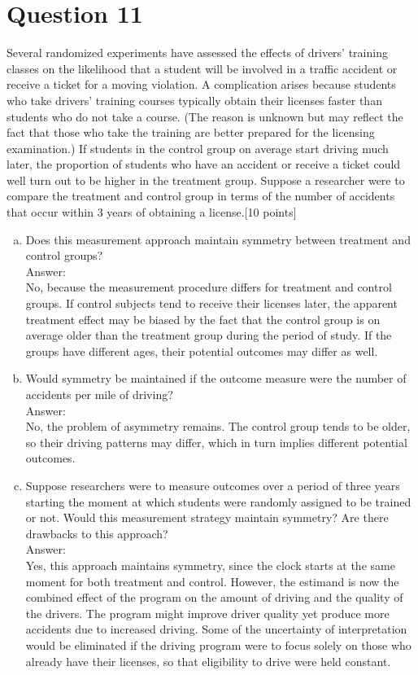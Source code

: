 \documentclass[11pt,notitlepage]{article}\usepackage[]{graphicx}\usepackage[]{color}
\begin{document}
\section*{Question 11}
Several randomized experiments have assessed the effects of drivers' training classes on the likelihood that a student will be involved in a traffic accident or receive a ticket for a moving violation.   A complication arises because students who take drivers' training courses typically obtain their licenses faster than students who do not take a course. (The reason is unknown but may reflect the fact that those who take the training are better prepared for the licensing examination.)  If students in the control group on average start driving much later, the proportion of students who have an accident or receive a ticket could well turn out to be higher in the treatment group.  Suppose a researcher were to compare the treatment and control group in terms of the number of accidents that occur within 3 years of obtaining a license.[10 points]

\begin{enumerate}[a)]
\item Does this measurement approach maintain symmetry between treatment and control groups?  \\
Answer:\\
No, because the measurement procedure differs for treatment and control groups.  If control subjects tend to receive their licenses later, the apparent treatment effect may be biased by the fact that the control group is on average older than the treatment group during the period of study.  If the groups have different ages, their potential outcomes may differ as well.\\
\item Would symmetry be maintained if the outcome measure were the number of accidents per mile of driving?  \\
Answer:\\
No, the problem of asymmetry remains.  The control group tends to be older, so their driving patterns may differ, which in turn implies different potential outcomes.
\item Suppose researchers were to measure outcomes over a period of three years starting the moment at which students were randomly assigned to be trained or not.  Would this measurement strategy maintain symmetry?  Are there drawbacks to this approach? \\
Answer:\\
Yes, this approach maintains symmetry, since the clock starts at the same moment for both treatment and control.  However, the estimand is now the combined effect of the program on the amount of driving and the quality of the drivers. The program might improve driver quality yet produce more accidents due to increased driving.  Some of the uncertainty of interpretation would be eliminated if the driving program were to focus solely on those who already have their licenses, so that eligibility to drive were held constant.
\end{enumerate}
\end{document}

